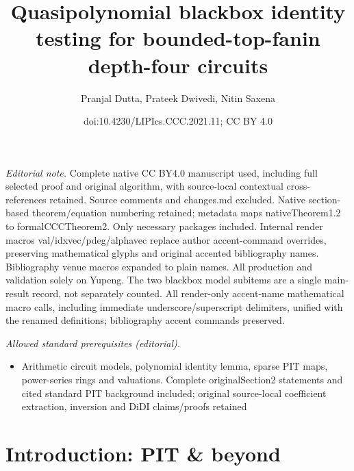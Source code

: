 \documentclass[10pt,a4paper]{article}
\title{Quasipolynomial blackbox identity testing for bounded-top-fanin depth-four circuits}
\author{Pranjal Dutta, Prateek Dwivedi, Nitin Saxena}
\date{doi:10.4230/LIPIcs.CCC.2021.11; CC BY 4.0}
\numberwithin{equation}{section}
\begin{document}
\maketitle
\noindent\textit{Editorial note.} Complete native CC BY4.0 manuscript used, including full selected proof and original algorithm, with source-local contextual cross-references retained. Source comments and changes.md excluded. Native section-based theorem/equation numbering retained; metadata maps nativeTheorem1.2 to formalCCCTheorem2. Only necessary packages included. Internal render macros val/idxvec/pdeg/alphavec replace author accent-command overrides, preserving mathematical glyphs and original accented bibliography names. Bibliography venue macros expanded to plain names. All production and validation solely on Yupeng. The two blackbox model subitems are a single main-result record, not separately counted. All render-only accent-name mathematical macro calls, including immediate underscore/superscript delimiters, unified with the renamed definitions; bibliography accent commands preserved.\par\medskip
\noindent\textit{Allowed standard prerequisites (editorial).}\begin{itemize}
\item Arithmetic circuit models, polynomial identity lemma, sparse PIT maps, power-series rings and valuations. Complete originalSection2 statements and cited standard PIT background included; original source-local coefficient extraction, inversion and DiDI claims/proofs retained
\end{itemize}\medskip
\section{Introduction: PIT \& beyond}
\end{document}

